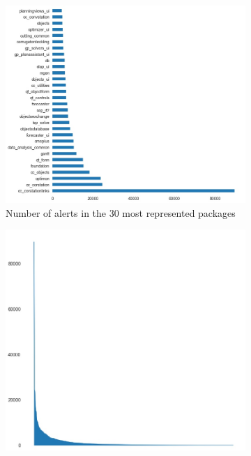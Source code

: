 \begin{figure}[H]
	\begin{subfigure}{0.5\textwidth}
		\centering
		\includegraphics[scale=0.3]{./src/data_analysis/alerts_packages_barh.jpg}
		\caption{Number of alerts in the 30 most represented packages}\label{}
	\end{subfigure}%
	\begin{subfigure}{0.5\textwidth}
		\centering
		\includegraphics[scale=0.3]{./src/data_analysis/alerts_packages_area.jpg}

\end{subfigure}
\end{figure}
